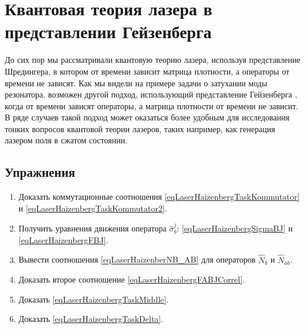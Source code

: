 \chapter{Квантовая теория лазера в представлении Гейзенберга}
\label{chLaser2}

До сих пор мы рассматривали квантовую теорию лазера, используя
представление Шредингера, в котором от времени зависит матрица
плотности, а операторы от времени не зависят. Как мы видели на примере
задачи о затухании моды резонатора, возможен другой подход,
использующий представление Гейзенберга
\cite{bScullyQuantumOptics2003}, 
когда от времени зависят
операторы, а матрица плотности от времени не зависит. В ряде случаев
такой подход может оказаться более удобным для исследования тонких
вопросов квантовой теории лазеров, таких например, как генерация
лазером поля в сжатом состоянии. 






\section{Упражнения}
\begin{enumerate}
\item Доказать коммутационные соотношения
  \eqref{eqLaserHaizenbergTaskKommutator} и \eqref{eqLaserHaizenbergTaskKommutator2}.
\item Получить уравнения движения оператора $\hat{\sigma}_b^j$: \eqref{eqLaserHaizenbergSigmaBJ} и 
\eqref{eqLaserHaizenbergFBJ}.
\item Вывести соотношения \eqref{eqLaserHaizenberNB_AB} для
  операторов $\hat{N}_b$ и $\hat{N}_{ab}$.
\item Доказать второе соотношение \eqref{eqLaserHaizenbergFABJCorrel}.
\item Доказать \eqref{eqLaserHaizenbergTaskMiddle}.
\item Доказать \eqref{eqLaserHaizenbergTaskDelta}.
\end{enumerate}

